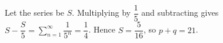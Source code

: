Let the series be $S$. Multiplying by $\dfrac{1}{5}$ and subtracting gives $S-\dfrac{S}{5}=\sum_{n=1}^{\infty}\dfrac{1}{5^n}=\dfrac{1}{4}$. Hence $S=\dfrac{5}{16}$, so $\boxed{p+q=21}$.
